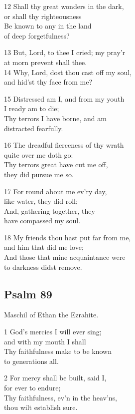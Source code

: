 12 Shall thy great wonders in the dark,\\
or shall thy righteousness\\
Be known to any in the land\\
of deep forgetfulness?

13 But, Lord, to thee I cried; my pray’r\\
at morn prevent shall thee.\\
14 Why, Lord, dost thou cast off my soul,\\
and hid’st thy face from me?

15 Distressed am I, and from my youth\\
I ready am to die;\\
Thy terrors I have borne, and am\\
distracted fearfully.

16 The dreadful fierceness of thy wrath\\
quite over me doth go:\\
Thy terrors great have cut me off,\\
they did pursue me so.

17 For round about me ev’ry day,\\
like water, they did roll;\\
And, gathering together, they\\
have compassed my soul.

18 My friends thou hast put far from me,\\
and him that did me love;\\
And those that mine acquaintance were\\
to darkness didst remove.

\begin{center}
\quad{}\quad{}
\end{center}


\subsection*{Psalm 89}

Maschil of Ethan the Ezrahite.

1 God’s mercies I will ever sing;\\
and with my mouth I shall\\
Thy faithfulness make to be known\\
to generations all.

2 For mercy shall be built, said I,\\
for ever to endure;\\
Thy faithfulness, ev’n in the heav’ns,\\
thou wilt establish sure.

